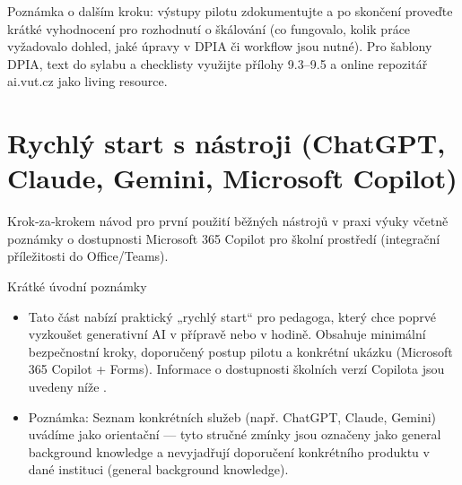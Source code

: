 \documentclass{report}%
\begin{document}
Poznámka o dalším kroku: výstupy pilotu zdokumentujte a po skončení proveďte krátké vyhodnocení pro rozhodnutí o škálování (co fungovalo, kolik práce vyžadovalo dohled, jaké úpravy v DPIA či workflow jsou nutné). Pro šablony DPIA, text do sylabu a checklisty využijte přílohy 9.3–9.5 a online repozitář ai.vut.cz jako living resource.%

%
\section{Rychlý start s nástroji (ChatGPT, Claude, Gemini, Microsoft Copilot)}%
Krok‑za‑krokem návod pro první použití běžných nástrojů v praxi výuky včetně poznámky o dostupnosti Microsoft 365 Copilot pro školní prostředí (integrační příležitosti do Office/Teams).%


%
Krátké úvodní poznámky
\begin{itemize}
  \item Tato část nabízí praktický „rychlý start“ pro pedagoga, který chce poprvé vyzkoušet generativní AI v přípravě nebo v hodině. Obsahuje minimální bezpečnostní kroky, doporučený postup pilotu a konkrétní ukázku (Microsoft 365 Copilot + Forms). Informace o dostupnosti školních verzí Copilota jsou uvedeny níže \cite{kb_ai_101_tipu_pdf_04e4a115_page_3_1, kb_ai_101_tipu_pdf_04e4a115_page_36_1}.
  \item Poznámka: Seznam konkrétních služeb (např. ChatGPT, Claude, Gemini) uvádíme jako orientační — tyto stručné zmínky jsou označeny jako general background knowledge a nevyjadřují doporučení konkrétního produktu v dané instituci (general background knowledge).
\end{itemize}
\end{document}
